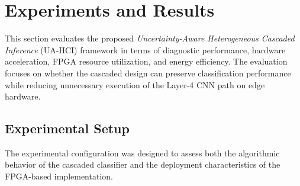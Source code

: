 \section{Experiments and Results}
\label{sec:experimentsResults}

This section evaluates the proposed \textit{Uncertainty-Aware Heterogeneous Cascaded Inference} (UA-HCI) framework in terms of diagnostic performance, hardware acceleration, FPGA resource utilization, and energy efficiency. The evaluation focuses on whether the cascaded design can preserve classification performance while reducing unnecessary execution of the Layer-4 CNN path on edge hardware.

\subsection{Experimental Setup}
The experimental configuration was designed to assess both the algorithmic behavior of the cascaded classifier and the deployment characteristics of the FPGA-based implementation.

